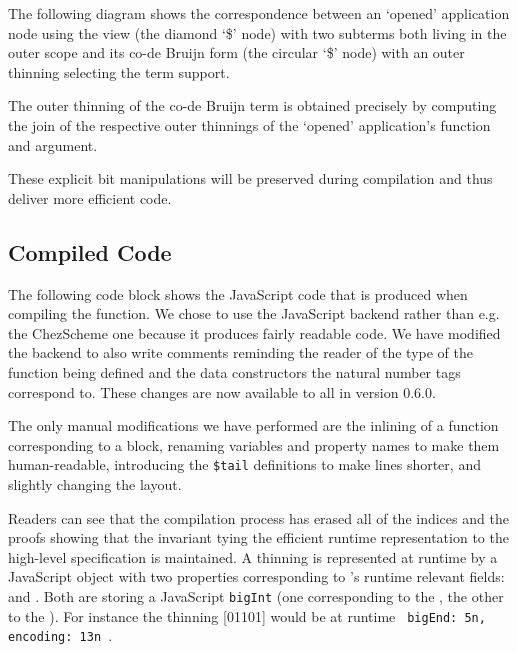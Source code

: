 The following diagram shows the correspondence between an `opened' application node
using the view (the diamond `\$' node) with two subterms both living in the outer scope
and its co-de Bruijn form (the circular `\$' node) with an outer thinning selecting the
term support.

\noindent
\begin{minipage}{.45\textwidth}\center
\end{minipage}\hfill
\begin{minipage}{.45\textwidth}\center
\end{minipage}

The outer thinning of the co-de Bruijn term is obtained precisely by
computing the join of the respective outer thinnings of the `opened'
application's function and argument.

These explicit bit manipulations will be preserved during compilation and
thus deliver more efficient code.


\subsection{Compiled Code}\label{sec:compiledview}

The following code block shows the JavaScript code that is produced when compiling the
 function. We chose to use the JavaScript backend rather than e.g.
the ChezScheme one because it produces fairly readable code.
%
We have modified the backend to also write comments reminding the reader of the type
of the function being defined and the data constructors the natural number tags
correspond to.
%
These changes are now available to all in \idris{} version 0.6.0.

The only manual modifications we have performed are the inlining of a function
corresponding to a  block, renaming variables and property names
to make them human-readable, introducing the \texttt{\$tail} definitions to make
lines shorter, and slightly changing the layout.



Readers can see that the compilation process has erased all of the indices
and the proofs
showing that the invariant tying the efficient runtime representation to the
high-level specification is maintained.
%
A thinning is represented at runtime by a JavaScript object with two properties
corresponding to 's runtime relevant fields: 
and .
%
Both are storing a JavaScript \texttt{bigInt} (one corresponding to the
, the other to the ).
%
For instance the thinning [01101] would be at runtime
\texttt{{ bigEnd: 5n, encoding: 13n }}.
%


